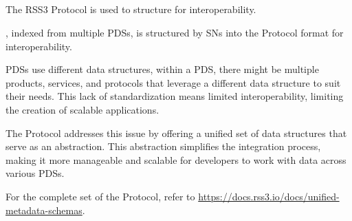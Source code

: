 \subsection{}
\label{subsec:protocol}

The RSS3 Protocol is used to structure  for interoperability.

, indexed from multiple \glspl{PDS}, is structured by \glspl{SN} into the \gls{Protocol} format for interoperability.

\glspl{PDS} use different data structures, within a \gls{PDS}, there might be multiple products, services, and protocols that leverage a different data structure to suit their needs.
This lack of standardization means limited interoperability, limiting the creation of scalable applications.

The \gls{Protocol} addresses this issue by offering a unified set of data structures that serve as an abstraction.
This abstraction simplifies the integration process, making it more manageable and scalable for developers to work with data across various \glspl{PDS}.

For the complete set of the \gls{Protocol}, refer to \url{https://docs.rss3.io/docs/unified-metadata-schemas}.

